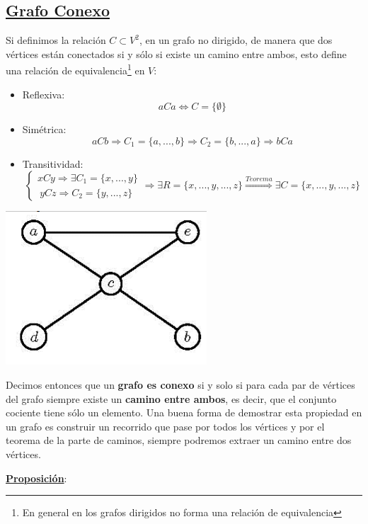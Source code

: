 \documentclass[10pt,a4paper,openright]{book}
\begin{document}
\subsection*{\underline{Grafo Conexo}}
Si definimos la relación $C\subset V^2$, en un grafo no dirigido, de manera que dos vértices están conectados si y sólo si existe un camino entre ambos, esto define una relación de equivalencia\footnote{En general en los grafos dirigidos no forma una relación de equivalencia} en $V$:
\begin{itemize}
\item Reflexiva:
$$aCa\Leftrightarrow C=\{\emptyset\}$$

\item Simétrica:
$$aCb\Rightarrow C_1=\{a, ..., b\}\Rightarrow C_2=\{b, ..., a\}\Rightarrow bCa$$

\item Transitividad:
$$\begin{cases}xCy\Rightarrow \exists C_1=\{x, ..., y\}\\\ yCz\Rightarrow C_2=\{y, ..., z\} \end{cases} \Rightarrow \exists R=\{x, ..., y, ..., z\}\stackrel{Teorema}{\Rightarrow} \exists C=\{x,..., y, ..., z\} $$
\end{itemize}

\begin{center}
\includegraphics[scale=0.80]{grafo conexo}
\end{center}

Decimos entonces que un \textbf{grafo es conexo} si y solo si para cada par de vértices del grafo siempre existe un \textbf{camino entre ambos}, es decir, que el conjunto cociente tiene sólo un elemento. Una buena forma de demostrar esta propiedad en un grafo es construir un recorrido que pase por todos los vértices y por el teorema de la parte de caminos, siempre podremos extraer un camino entre dos vértices.

\underline{\textbf{Proposición}}:
\end{document}
